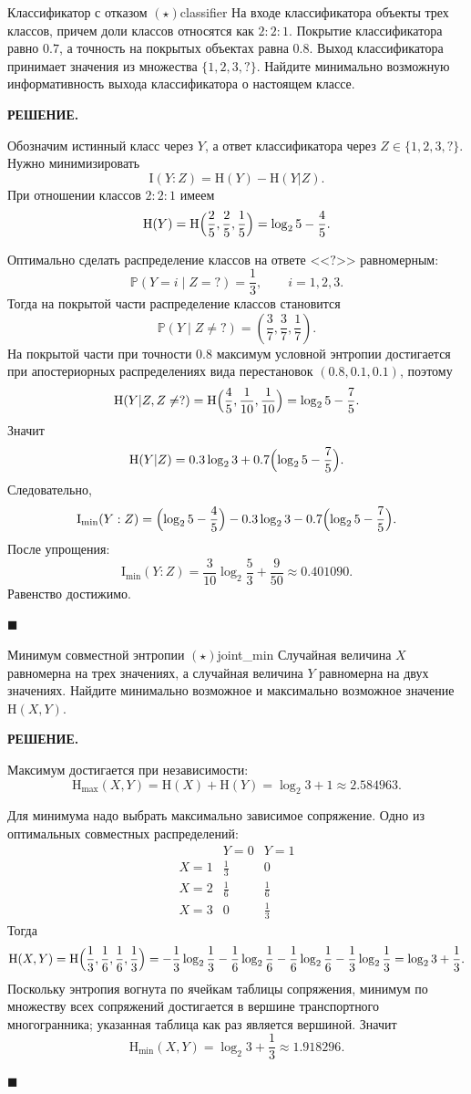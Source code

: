 \documentclass[12pt,a4paper]{article}
\newcommand{\HH}{\mathrm{H}}
\newcommand{\II}{\mathrm{I}}
\newcommand{\PP}{\mathbb{P}}
\newenvironment{solution}{
    \begin{tcolorbox}[
        enhanced, breakable, blanker,
        borderline west={2.5pt}{0pt}{solgray},
        left=12pt, top=5pt, bottom=5pt,
        before skip=10pt, after skip=15pt
    ]
    \textbf{\textsf{РЕШЕНИЕ.}}\;
}{
    \hfill $\blacksquare$
    \end{tcolorbox}
}
\begin{document}
\begin{problem}{Классификатор с отказом $(\star)$}{classifier}
На входе классификатора объекты трех классов, причем доли классов относятся как $2:2:1$. Покрытие классификатора равно $0.7$, а точность на покрытых объектах равна $0.8$. Выход классификатора принимает значения из множества $\{1,2,3,?\}$. Найдите минимально возможную информативность выхода классификатора о настоящем классе.
\end{problem}
\begin{solution}
Обозначим истинный класс через $Y$, а ответ классификатора через $Z\in \{1,2,3,?\}$. Нужно минимизировать
$$
\II(Y:Z)=\HH(Y)-\HH(Y|Z).
$$
При отношении классов $2:2:1$ имеем
$$
\HH(Y)=\HH\Bigl(\frac25,\frac25,\frac15\Bigr)=\log_2 5-\frac45.
$$

Оптимально сделать распределение классов на ответе <<$?$>> равномерным:
$$
\PP(Y=i\mid Z=? )=\frac13,\qquad i=1,2,3.
$$
Тогда на покрытой части распределение классов становится
$$
\PP(Y\mid Z\ne ?)=\left(\frac37,\frac37,\frac17\right).
$$
На покрытой части при точности $0.8$ максимум условной энтропии достигается при апостериорных распределениях вида перестановок $(0.8,0.1,0.1)$, поэтому
$$
\HH(Y|Z,Z\ne ?)=\HH\Bigl(\frac45,\frac1{10},\frac1{10}\Bigr)=\log_2 5-\frac75.
$$
Значит
$$
\HH(Y|Z)=0.3\log_2 3+0.7\Bigl(\log_2 5-\frac75\Bigr).
$$
Следовательно,
$$
\II_{\min}(Y:Z)
=\Bigl(\log_2 5-\frac45\Bigr)-0.3\log_2 3-0.7\Bigl(\log_2 5-\frac75\Bigr).
$$
После упрощения:
$$
\II_{\min}(Y:Z)=\frac{3}{10}\log_2\frac53+\frac9{50}\approx 0.401090.
$$
Равенство достижимо.
\end{solution}

\begin{problem}{Минимум совместной энтропии $(\star)$}{joint_min}
Случайная величина $X$ равномерна на трех значениях, а случайная величина $Y$ равномерна на двух значениях. Найдите минимально возможное и максимально возможное значение $\HH(X,Y)$.
\end{problem}
\begin{solution}
Максимум достигается при независимости:
$$
\HH_{\max}(X,Y)=\HH(X)+\HH(Y)=\log_2 3+1\approx 2.584963.
$$

Для минимума надо выбрать максимально зависимое сопряжение. Одно из оптимальных совместных распределений:
$$
\begin{array}{c|cc}
& Y=0 & Y=1\\ \hline
X=1 & \frac13 & 0\\
X=2 & \frac16 & \frac16\\
X=3 & 0 & \frac13
\end{array}
$$
Тогда
$$
\HH(X,Y)=\HH\Bigl(\frac13,\frac16,\frac16,\frac13\Bigr)
=-\frac13\log_2\frac13-\frac16\log_2\frac16-\frac16\log_2\frac16-\frac13\log_2\frac13
=\log_2 3+\frac13.
$$
Поскольку энтропия вогнута по ячейкам таблицы сопряжения, минимум по множеству всех сопряжений достигается в вершине транспортного многогранника; указанная таблица как раз является вершиной. Значит
$$
\HH_{\min}(X,Y)=\log_2 3+\frac13\approx 1.918296.
$$
\end{solution}
\end{document}
